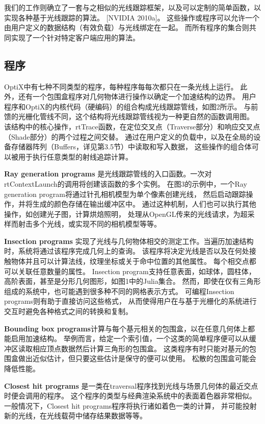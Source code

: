 我们的工作则确立了一套与之相似的光线跟踪框架，以及可以定制的简单函数，以实现各种基于光线跟踪的算法。 
[NVIDIA 2010a]。 
这些操作或程序可以允许一个由用户定义的数据结构（有效负载）与光线绑定在一起。 
而所有程序的集合则共同实现了一个针对特定客户端应用的算法。

\subsection{程序}

OptiX中有七种不同类型的程序，每种程序每每次都只在一条光线上运行。
此外，还有一个包围盒程序对几何物体进行操作以确定一个加速结构的边界。
用户程序和OptiX的内核代码（硬编码）的组合构成光线跟踪管线，如图2所示。
与前馈的光栅化管线不同，这个结构将光线跟踪管线视为一种更自然的函数调用图。
该结构中的核心操作，rtTrace函数，在定位交叉点（Traverse部分）和响应交叉点（Shade部分）的两个过程之间交替。
通过在用户定义的负载中，以及在全局的设备存储器阵列（Buffers，详见第3.5节）中读取和写入数据，
这些操作的组合体可以被用于执行任意类型的射线追踪计算。

\textbf{Ray generation programs} 
是光线跟踪管线的入口函数。一次对rtContextLaunch的调用将创建该函数的多个实例。
在图3的示例中，一个Ray generation program将通过针孔相机模型为单个像素创建光线，
然后启动跟踪操作，并将生成的颜色存储在输出缓冲区中。
通过这种机制，人们也可以执行其他操作，如创建光子图，计算烘焙照明，
处理从OpenGL传来的光线请求，为超采样而射击多个光线，或实现不同的相机模型等等。

\textbf{Insection programs} 
实现了光线与几何物体相交的测定工作。当遍历加速结构时，系统将通过该程序完成几何上的查询。
该程序将决定光线是否以及在何处接触物体并且可以计算法线，纹理坐标或关于命中位置的其他属性。
每个相交点都可以关联任意数量的属性。
Insection program支持任意表面，如球体，圆柱体，高阶表面，甚至是分形几何图形，如图1中的Julia集合。
然而，即使在仅有三角形组成的系统中，也可能遇到很多种不同的网格表示方式。
可编程Insection programs则有助于直接访问这些格式，
从而使得用户在与基于光栅化的系统进行交互时避免各种格式之间的转换和复制。

\textbf{Bounding box programs}计算与每个基元相关的包围盒，以在任意几何体上都能启用加速结构。
举例而言，给定一个索引值，一个这类的简单程序便可以从缓冲区读取相应顶点数据然后计算三角形的包围盒。
这类程序有时只能对基元的包围盒做出近似估计，但只要这些估计是保守的便可以使用。
松散的包围盒可能会降低性能。

\textbf{Closest hit programs}
是一类在traversal程序找到光线与场景几何体的最近交点时便会调用的程序。
这个程序的类型与经典渲染系统中的表面着色器非常相似。
一般情况下，Closest hit programs程序将执行诸如着色一类的计算，
并可能投射新的光线，在光线载荷中储存结果数据等等。

